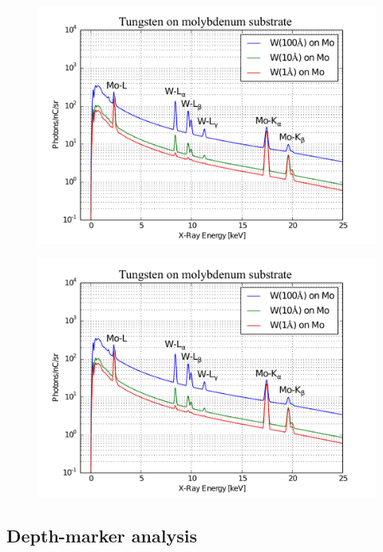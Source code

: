 \documentclass[12pt,letterpaper,final]{article}
\begin{document}
\begin{figure}[!h]
 \centering
  \includegraphics[width=\columnwidth]{figures//cModApplications/Tungsten_WMoSpectra.pdf}
 \caption{}
 \label{fig:Tungsten_WMoSpectra}
\end{figure}

\begin{figure}[!h]
 \centering
  \includegraphics[width=\columnwidth]{figures//cModApplications/Tungsten_WMoSpectra.pdf}
 \caption{}
 \label{fig:Tungsten_WMoSpectra}
\end{figure}


\subsection{Depth-marker analysis}
\label{sec:ApplicationsMarkers}
\end{document}
